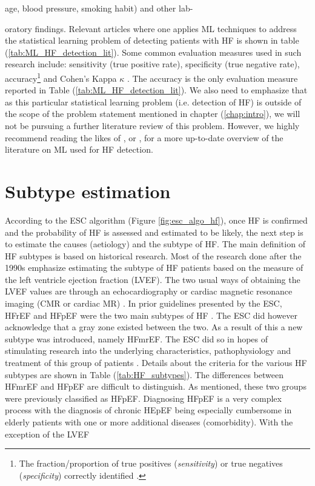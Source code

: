 \documentclass[../thesis.tex]{subfiles}
\begin{document}
age, blood pressure, smoking habit) and other lab-



\noindent oratory findings. Relevant articles where one applies ML techniques to address the statistical learning problem of detecting patients with HF is shown in table (\ref{tab:ML_HF_detection_lit}). Some common evaluation measures used in such research include: sensitivity (true positive rate), specificity (true negative rate), accuracy\footnote{The fraction/proportion of true positives (\textit{sensitivity}) or true negatives (\textit{specificity}) correctly identified \citep{james2013introduction}.} and Cohen's Kappa $\kappa$ \citep{cohen1960coefficient}. The accuracy is the only evaluation measure reported in Table (\ref{tab:ML_HF_detection_lit}). We also need to emphasize that as this particular statistical learning problem (i.e. detection of HF) is outside of the scope of the problem statement mentioned in chapter (\ref{chap:intro}), we will not be pursuing a further literature review of this problem. However, we highly recommend reading the likes of \cite{tripoliti2017heart}, \cite{acharya2017application} or \cite{awan2018machine}, for a more up-to-date overview of the literature on ML used for HF detection. 


\section{Subtype estimation}
\label{sec:subtypeest}

\noindent According to the ESC algorithm (Figure \ref{fig:esc_algo_hf}), once HF is confirmed and the probability of HF is assessed and estimated to be likely, the next step is to estimate the causes (aetiology) and the subtype of HF. The main definition of HF subtypes is based on historical research. Most of the research done after the 1990s emphasize estimating the subtype of HF patients based on the measure of the left ventricle ejection fraction (LVEF). The two usual ways of obtaining the LVEF values are through an echocardiography or cardiac magnetic resonance imaging (CMR or cardiac MR) \citep{ponikowski2016}. In prior guidelines presented by the ESC, HFrEF and HFpEF were the two main subtypes of HF \citep{authors2012esc}. The ESC did however acknowledge that a gray zone existed between the two. As a result of this a new subtype was introduced, namely HFmrEF. The ESC did so in hopes of stimulating research into the underlying characteristics, pathophysiology and treatment of this group of patients \citep{ponikowski2016}. Details about the criteria for the various HF subtypes are shown in Table (\ref{tab:HF_subtypes}). The differences between HFmrEF and HFpEF are difficult to distinguish. As mentioned, these two groups were previously classified as HFpEF. Diagnosing HFpEF is a very complex process with the diagnosis of chronic HEpEF being especially cumbersome in elderly patients with one or more additional diseases (comorbidity). With the exception of the LVEF 
\end{document}
